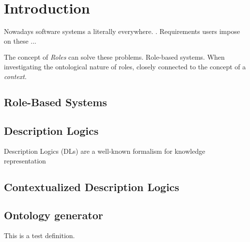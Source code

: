 

\listoftodos

\chapter{Introduction}
\label{ch:introduction}

Nowadays software systems a literally everywhere. . Requirements
users impose on these ... 

The concept of \emph{Roles} can solve these problems.  Role-based
systems. When investigating the ontological nature of roles, closely connected to the concept of a
\emph{context}.  


\blindtext

\section{Role-Based Systems}
\label{sec:intro-role-based-systems}

\blindtext

\section{Description Logics}
\label{sec:intro-description-logics}

Description Logics (DLs) are a well-known formalism for knowledge representation


\section{Contextualized Description Logics}
\label{sec:intro-contextualized-description-logics}

\blindtext

\section{Ontology generator}
\label{sec:zweite-section}

\blindtext 

\begin{definition}
  This is a test definition.
\end{definition}

